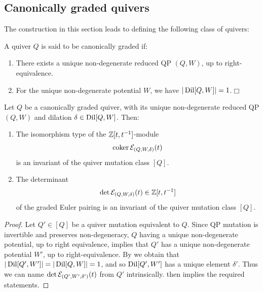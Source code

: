 \subsection{Canonically graded quivers}\label{ssec:canonically_gradedQPs} The construction in this section leads to defining the following class of quivers:

\begin{definition}\label{def:canonically_graded} A quiver $Q$ is said to be canonically graded if:
\begin{enumerate}
    \item There exists a unique non-degenerate reduced QP $(Q,W)$, up to right-equivalence.

    \item For the unique non-degenerate potential $W$, we have $|\operatorname{Dil}[Q,W]|=1$.\hfill$\Box$
\end{enumerate}
\end{definition}

\begin{corollary}\label{cor:canonically_graded_invariant}
Let $Q$ be a canonically graded quiver, with its unique non-degenerate reduced QP $(Q,W)$ and dilation $\delta\in \operatorname{Dil}[Q,W]$. Then:

\begin{enumerate}
    \item The isomorphism type of the $\mathbb Z[t,t^{-1}]$-module
    $$\operatorname{coker} \mathcal E_{(Q,W,\delta)}(t)$$
    is an invariant of the quiver mutation class $[Q]$.\\

    \item The determinant
$$\det\mathcal E_{(Q,W,\delta)}(t)\in\mathbb Z[t,t^{-1}]$$
of the graded Euler pairing is an invariant of the quiver mutation class $[Q]$.
\end{enumerate}
\end{corollary}

\begin{proof}
Let $Q'\in[Q]$ be a quiver mutation equivalent to $Q$. Since QP mutation is invertible and preserves non-degeneracy, $Q$ having a unique non-degenerate potential, up to right equivalence, implies that $Q'$ has a unique non-degenerate potential $W'$, up to right-equivalence. By  we obtain that $|\operatorname{Dil}[Q',W']|=|\operatorname{Dil}[Q,W]|=1$, and so $\operatorname{Dil}[Q',W']$ has a unique element $\delta'$. Thus we can name $\det\mathcal E_{(Q',W',\delta')}(t)$ from $Q'$ intrinsically.  then implies the required statements.
\end{proof}

